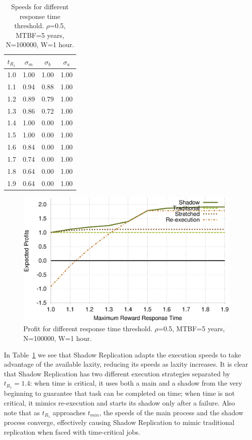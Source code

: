 \begin{table}[!h]\small
	\caption{Speeds for different response time threshold. $\rho$=0.5, MTBF=5 years, N=100000, W=1 hour.}
	\centering
		\begin{tabular}{|c|c|c|c|}
		\hline
		$t_{R_1}$ & $\sigma_m$ & $\sigma_b$ & $\sigma_a$ \\
		\hline
		1.0	&	1.00 & 	1.00 &	1.00 \\
		\hline
		1.1	&	0.94 &	0.88 &	1.00 \\
		\hline
		1.2	&	0.89 &	0.79 &	1.00 \\
		\hline
		1.3	&	0.86 &	0.72 &	1.00 \\
		\hline
		1.4	&	1.00 &	0.00 &	1.00 \\
		\hline
		1.5	&	1.00 &	0.00 &	1.00 \\
		\hline
		1.6	&	0.84 &	0.00 &	1.00 \\
		\hline
		1.7	&	0.74 &	0.00 &	1.00 \\
		\hline
		1.8	&	0.64 &	0.00 &	1.00 \\
		\hline
		1.9	&	0.64 &	0.00 &	1.00 \\
		\hline
		\end{tabular}
	\label{tbl:t}
\end{table}

\begin{figure}[!h]	
	\begin{center}
		\includegraphics[width=\columnwidth]{diagrams/t_profit.eps}
	\end{center}
	\caption{Profit for different response time threshold. $\rho$=0.5, MTBF=5 years, N=100000, W=1 hour.}
	\label{fig:t}
\end{figure}

In Table~\ref{tbl:t} we see that Shadow Replication adapts the execution
speeds to take advantage of the available laxity, reducing its speeds
as laxity increases. It is clear that Shadow Replication has two different execution strategies separated by $t_{R_1}=1.4$: when time is critical, it uses both a main and a shadow from the very beginning to guarantee that task can be completed on time; when time is not critical, it mimics re-execution and starts its shadow only after a failure.
Also note that as $t_{R_1}$
approaches $t_{min}$, the speeds of the main process and the shadow process
converge, effectively causing Shadow Replication to mimic traditional
replication when faced with time-critical jobs.


